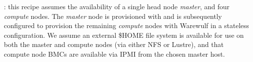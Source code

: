 : this recipe assumes the availability of a single head node
{\em master}, and four {\em compute} nodes. The {\em master} node is
provisioned with \baseOS{} and is subsequently configured to provision the
remaining {\em compute} nodes with Warewulf in a stateless configuration. We
assume an external \$HOME file system is available for use on both the master
and compute nodes (via either NFS or Lustre), and that compute node BMCs are
available via IPMI from the chosen master host.
